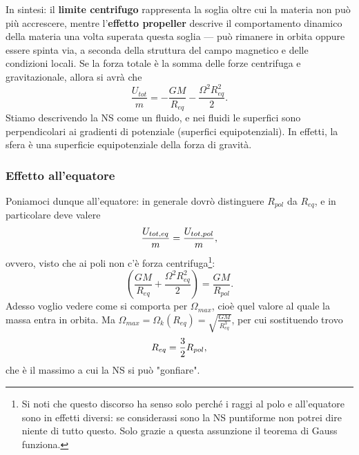 In sintesi: il \textbf{limite centrifugo} rappresenta la soglia oltre cui la materia non può più accrescere, mentre l’\textbf{effetto propeller} descrive il comportamento dinamico della materia una volta superata questa soglia — può rimanere in orbita oppure essere spinta via, a seconda della struttura del campo magnetico e delle condizioni locali.
Se la forza totale è la somma delle forze centrifuga e gravitazionale, allora si avrà che 
\begin{equation}
    \frac{U_{tot}}{m} = -\frac{GM}{R_{eq}} - \frac{\Omega^2R_{eq}^2}{2}.
\end{equation}
Stiamo descrivendo la NS come un fluido, e nei fluidi le superfici sono perpendicolari ai gradienti di potenziale (superfici equipotenziali).
In effetti, la sfera è una superficie equipotenziale della forza di gravità.\vspace{2mm}
\subsubsection{Effetto all'equatore}
Poniamoci dunque all'equatore: in generale dovrò distinguere $R_{pol}$ da $R_{eq} $, e in particolare deve valere
\begin{equation}
    \frac{U_{tot,eq}}{m} = \frac{U_{tot,pol}}{m}\notag,
\end{equation}
ovvero, visto che ai poli non c'è forza centrifuga\footnote{Si noti che questo discorso ha senso solo perché i raggi al polo e all'equatore sono in effetti diversi: se considerassi sono la NS puntiforme non potrei dire niente di tutto questo. 
Solo grazie a questa assunzione il teorema di Gauss funziona.}:
\begin{equation}
    \left( \frac{GM}{R_{eq}} + \frac{\Omega^2R_{eq}^2}{2} \right) =  \frac{GM}{R_{pol}}.
\end{equation}
Adesso voglio vedere come si comporta per $\Omega_{max}$, cioè quel valore al quale la massa entra in orbita. 
Ma $\Omega_{max} = \Omega_k(R_{eq}) = \sqrt{\frac{GM}{R_{eq}^3}} $, per cui sostituendo trovo
\begin{equation}
    R_{eq} = \frac{3}{2}R_{pol}, \notag
    \label{eq: relazione raggi modello Roche}
\end{equation}
che è il massimo a cui la NS si può "gonfiare".

